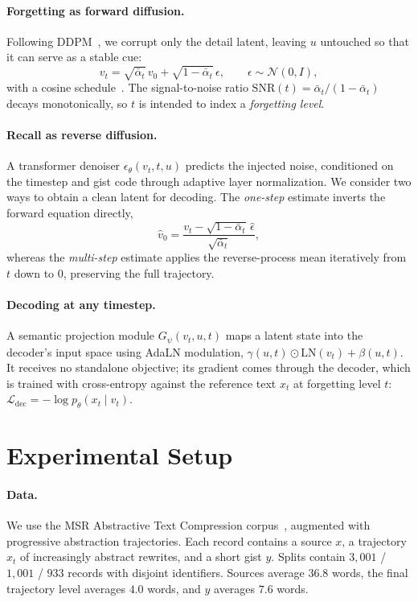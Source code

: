 \documentclass{article}
\begin{document}
\paragraph{Forgetting as forward diffusion.}
Following DDPM~\citep{ho2020}, we corrupt only the detail latent, leaving $u$ untouched so that it can serve as a stable cue:
\begin{equation}
v_t = \sqrt{\bar\alpha_t}\, v_0 + \sqrt{1-\bar\alpha_t}\, \epsilon, \qquad \epsilon \sim \mathcal{N}(0, I),
\end{equation}
with a cosine schedule~\citep{nichol2021}. The signal-to-noise ratio $\mathrm{SNR}(t) = \bar\alpha_t / (1-\bar\alpha_t)$ decays monotonically, so $t$ is intended to index a \emph{forgetting level}.

\paragraph{Recall as reverse diffusion.}
A transformer denoiser $\epsilon_\theta(v_t, t, u)$ predicts the injected noise, conditioned on the timestep and gist code through adaptive layer normalization. We consider two ways to obtain a clean latent for decoding. The \emph{one-step} estimate inverts the forward equation directly,
\begin{equation}
\hat v_0 = \frac{v_t - \sqrt{1-\bar\alpha_t}\,\hat\epsilon}{\sqrt{\bar\alpha_t}},
\label{eq:onestep}
\end{equation}
whereas the \emph{multi-step} estimate applies the reverse-process mean iteratively from $t$ down to $0$, preserving the full trajectory.

\paragraph{Decoding at any timestep.}
A semantic projection module $G_\psi(v_t, u, t)$ maps a latent state into the decoder's input space using AdaLN modulation, $\gamma(u,t) \odot \mathrm{LN}(v_t) + \beta(u,t)$. It receives no standalone objective; its gradient comes through the decoder, which is trained with cross-entropy against the reference text $x_t$ at forgetting level $t$: $\mathcal{L}_{\text{dec}} = -\log p_\theta(x_t \mid \hat v_t)$.

\section{Experimental Setup}

\paragraph{Data.}
We use the MSR Abstractive Text Compression corpus~\citep{toutanova2016}, augmented with progressive abstraction trajectories. Each record contains a source $x$, a trajectory $x_t$ of increasingly abstract rewrites, and a short gist $y$. Splits contain $3{,}001$ / $1{,}001$ / $933$ records with disjoint identifiers. Sources average $36.8$ words, the final trajectory level averages $4.0$ words, and $y$ averages $7.6$ words.
\end{document}
